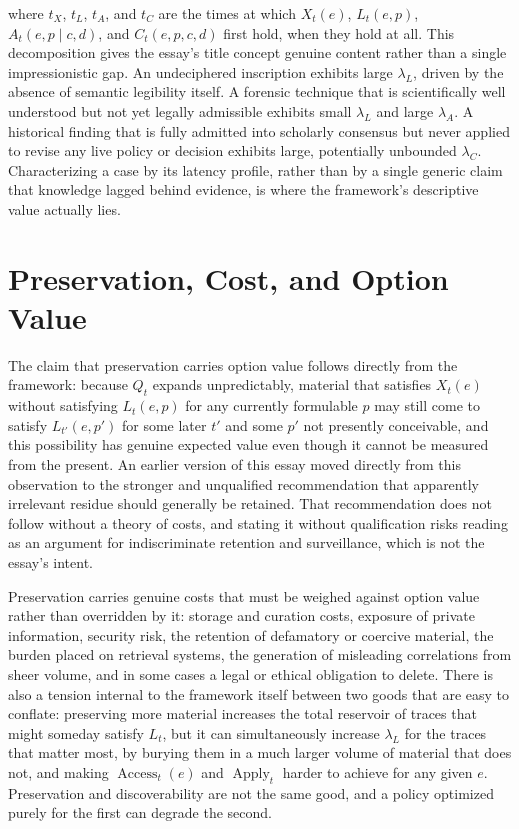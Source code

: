 \documentclass[11pt]{article}
\begin{document}
where $t_X$, $t_L$, $t_A$, and $t_C$ are the times at which $X_t(e)$, $L_t(e,p)$, $A_t(e,p\mid c,d)$, and $C_t(e,p,c,d)$ first hold, when they hold at all. This decomposition gives the essay's title concept genuine content rather than a single impressionistic gap. An undeciphered inscription exhibits large $\lambda_L$, driven by the absence of semantic legibility itself. A forensic technique that is scientifically well understood but not yet legally admissible exhibits small $\lambda_L$ and large $\lambda_A$. A historical finding that is fully admitted into scholarly consensus but never applied to revise any live policy or decision exhibits large, potentially unbounded $\lambda_C$. Characterizing a case by its latency profile, rather than by a single generic claim that knowledge lagged behind evidence, is where the framework's descriptive value actually lies.

\section{Preservation, Cost, and Option Value}

The claim that preservation carries option value follows directly from the framework: because $Q_t$ expands unpredictably, material that satisfies $X_t(e)$ without satisfying $L_t(e,p)$ for any currently formulable $p$ may still come to satisfy $L_{t'}(e,p')$ for some later $t'$ and some $p'$ not presently conceivable, and this possibility has genuine expected value even though it cannot be measured from the present. An earlier version of this essay moved directly from this observation to the stronger and unqualified recommendation that apparently irrelevant residue should generally be retained. That recommendation does not follow without a theory of costs, and stating it without qualification risks reading as an argument for indiscriminate retention and surveillance, which is not the essay's intent.

Preservation carries genuine costs that must be weighed against option value rather than overridden by it: storage and curation costs, exposure of private information, security risk, the retention of defamatory or coercive material, the burden placed on retrieval systems, the generation of misleading correlations from sheer volume, and in some cases a legal or ethical obligation to delete. There is also a tension internal to the framework itself between two goods that are easy to conflate: preserving more material increases the total reservoir of traces that might someday satisfy $L_t$, but it can simultaneously increase $\lambda_L$ for the traces that matter most, by burying them in a much larger volume of material that does not, and making $\operatorname{Access}_t(e)$ and $\operatorname{Apply}_t$ harder to achieve for any given $e$. Preservation and discoverability are not the same good, and a policy optimized purely for the first can degrade the second.
\end{document}
